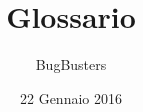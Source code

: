 
%



\usepackage{tracklang}
\usepackage[toc,nonumberlist,nopostdot]{glossaries}

\title{\textbf{Glossario}}
\author{BugBusters}

\date{22 Gennaio 2016}

\makeglossaries






\makeFrontPage



\glsaddall %
\printglossary[title=Glossario,toctitle=Glossario dei termini,style=indexgroup,style=altlistgroup]


